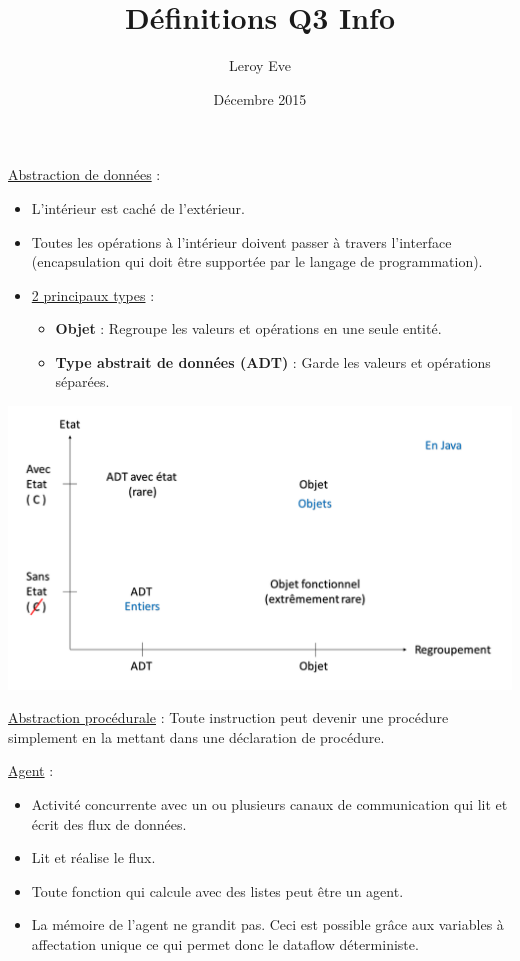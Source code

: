 \documentclass[fr,license=none]{../../../eplsummary}
\title{Définitions Q3 Info}
\author{Leroy Eve}
\date{Décembre 2015}
\begin{document}
\maketitle
\begin{flushleft}


\textcolor{mauvedef}{\underline{Abstraction de données}} : 

\begin{itemize}
\item L'intérieur est caché de l'extérieur.
\item Toutes les opérations à l'intérieur doivent passer à travers l'interface (encapsulation qui doit être supportée par le langage de programmation).
\item \underline{2 principaux types} :
\begin{itemize}[label=\textbullet]
\item \textbf{Objet} : Regroupe les valeurs et opérations en une seule entité.
\item \textbf{Type abstrait de données (ADT)} : Garde les valeurs et opérations séparées.
\end{itemize}
\end{itemize}
\begin{center}
\includegraphics[scale=0.4]{ADD.png}
\label{add2}
\end{center}
\bigbreak


\textcolor{mauvedef}{\underline{Abstraction procédurale}} : Toute instruction peut devenir une procédure simplement en la mettant dans une déclaration de procédure.\bigbreak

\textcolor{mauvedef}{\underline{Agent}} :

\begin{itemize}
\item Activité concurrente avec un ou plusieurs canaux de communication qui lit et écrit des flux de données.
\item Lit et réalise le flux.
\item Toute fonction qui calcule avec des listes peut être un agent.
\item La mémoire de l'agent ne grandit pas. Ceci est possible grâce aux variables à affectation unique ce qui permet donc le dataflow déterministe.
\end{itemize} \bigbreak



\end{flushleft}
\end{document}
